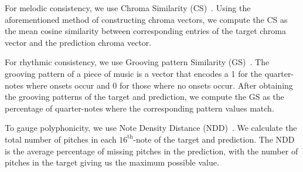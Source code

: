For melodic consistency, we use Chroma Similarity (CS)~\cite{wu_musemorphose_2021}. Using the aforementioned method of constructing chroma vectors, we compute the CS as the mean cosine similarity between corresponding entries of the target chroma vector and the prediction chroma vector.

For rhythmic consistency, we use Grooving pattern Similarity (GS)~\cite{wu_jazz_2020}. The grooving pattern of a piece of music is a vector that encodes a 1 for the quarter-notes where onsets occur and 0 for those where no onsets occur. After obtaining the grooving patterns of the target and prediction, we compute the GS as the percentage of quarter-notes where the corresponding pattern values match.

To gauge polyphonicity, we use Note Density Distance (NDD)~\cite{agarwal_structure_2024, haki_real_2022}. We calculate the total number of pitches in each $16^{\text{th}}$-note of the target and prediction. The NDD is the average percentage of missing pitches in the prediction, with the number of pitches in the target giving us the maximum possible value.